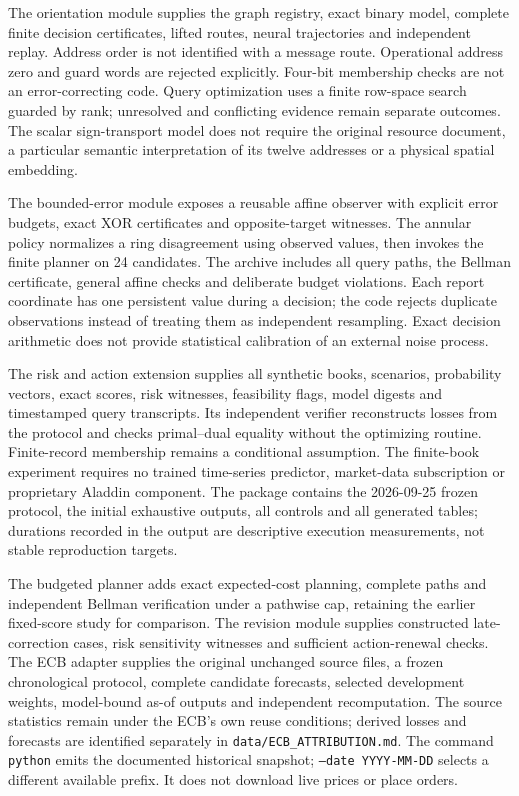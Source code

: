 \documentclass[11pt,a4paper]{article}
\theoremstyle{definition}\newtheorem{definition}[theorem]{Definition}
\begin{document}
The orientation module supplies the graph registry, exact binary model, complete finite decision certificates, lifted routes, neural trajectories and independent replay. Address order is not identified with a message route. Operational address zero and guard words are rejected explicitly. Four-bit membership checks are not an error-correcting code. Query optimization uses a finite row-space search guarded by rank; unresolved and conflicting evidence remain separate outcomes. The scalar sign-transport model does not require the original resource document, a particular semantic interpretation of its twelve addresses or a physical spatial embedding.

The bounded-error module exposes a reusable affine observer with explicit error budgets, exact XOR certificates and opposite-target witnesses. The annular policy normalizes a ring disagreement using observed values, then invokes the finite planner on 24 candidates. The archive includes all query paths, the Bellman certificate, general affine checks and deliberate budget violations. Each report coordinate has one persistent value during a decision; the code rejects duplicate observations instead of treating them as independent resampling. Exact decision arithmetic does not provide statistical calibration of an external noise process.

The risk and action extension supplies all synthetic books, scenarios, probability vectors, exact scores, risk witnesses, feasibility flags, model digests and timestamped query transcripts. Its independent verifier reconstructs losses from the protocol and checks primal--dual equality without the optimizing routine. Finite-record membership remains a conditional assumption. The finite-book experiment requires no trained time-series predictor, market-data subscription or proprietary Aladdin component. The package contains the 2026-09-25 frozen protocol, the initial exhaustive outputs, all controls and all generated tables; durations recorded in the output are descriptive execution measurements, not stable reproduction targets.

The budgeted planner adds exact expected-cost planning, complete paths and independent Bellman verification under a pathwise cap, retaining the earlier fixed-score study for comparison. The revision module supplies constructed late-correction cases, risk sensitivity witnesses and sufficient action-renewal checks. The ECB adapter supplies the original unchanged source files, a frozen chronological protocol, complete candidate forecasts, selected development weights, model-bound as-of outputs and independent recomputation. The source statistics remain under the ECB's own reuse conditions; derived losses and forecasts are identified separately in \texttt{data/ECB\_ATTRIBUTION.md}. The command \texttt{python}  emits the documented historical snapshot; \texttt{--date YYYY-MM-DD} selects a different available prefix. It does not download live prices or place orders.
\end{document}
